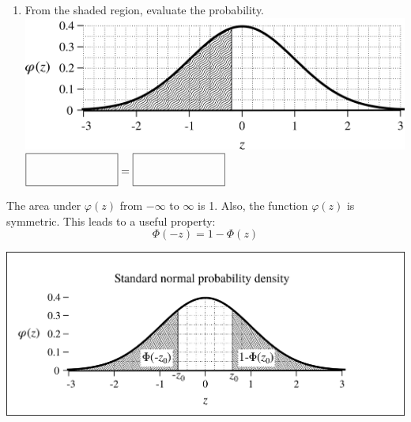 \documentclass[12pt,letterpaper]{article}
\begin{document}
\begin{enumerate}
\begin{enumerate}
\vfill
\item From the shaded region, evaluate the probability.
\\\includegraphics[scale=0.7]{n0p2.png}  $\emptybox=\emptybox$
\vfill
\end{enumerate}
\end{enumerate}

\newpage
The area under $\varphi(z)$ from $-\infty$ to $\infty$ is 1. Also, the function $\varphi(z)$ is symmetric. This leads to a useful property:
$$\Phi(-z) = 1-\Phi(z) $$
\begin{center}
\includegraphics[scale=0.7]{prop.png}
\end{center}
\end{document}
